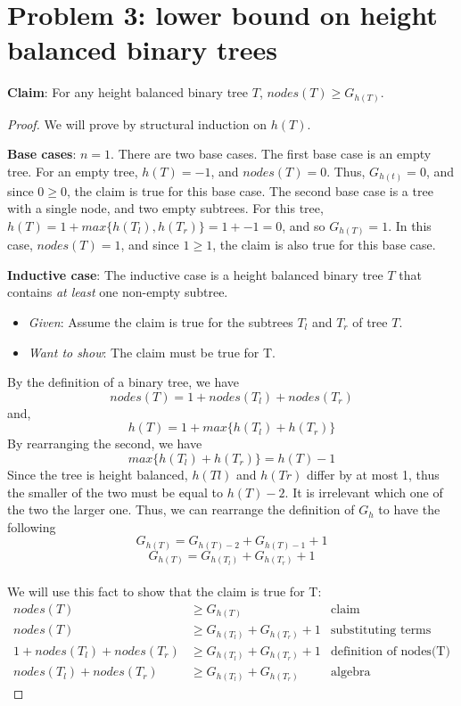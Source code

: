 \documentclass[titlepage]{article}
\begin{document}
\section{Problem 3: lower bound on height balanced binary trees}

\textbf{Claim}: For any height balanced binary tree $T$, $nodes(T) \geq G_{h(T)}$.

\begin{proof}
We will prove by structural induction on $h(T)$.

\textbf{Base cases}: $n=1$.  There are two base cases. The first base case is an empty tree. For an empty tree, $h(T) = -1$, and $nodes(T)=0$. Thus, $G_{h(t)}=0$, and since $0\geq0$, the claim is true for this base case. The second base case is a tree with a single node, and two empty subtrees. For this tree, $h(T) = 1 + max\{h(T_l), h(T_r)\} = 1 + -1 = 0$, and so $G_{h(T)} = 1$. In this case, $nodes(T)=1$, and since $1\geq1$, the claim is also true for this base case.


\textbf{Inductive case}: The inductive case is a height balanced binary tree $T$ that contains \textit{at least} one non-empty subtree.
\begin{itemize}
\item \emph{Given}: Assume the claim is true for the subtrees $T_l$ and $T_r$ of tree $T$.
\item \emph{Want to show}: The claim must be true for T.
\end{itemize}
By the definition of a binary tree, we have
$$nodes(T) = 1 + nodes(T_l) + nodes(T_r)$$
and,
$$h(T) = 1 + max\{h(T_l) + h(T_r)\}$$
By rearranging the second, we have
$$max\{h(T_l) + h(T_r)\} = h(T) - 1$$
Since the tree is height balanced, $h(Tl)$ and $h(Tr)$ differ by at most 1, thus the smaller of the two must be equal to $h(T) - 2$. It is irrelevant which one of the two the larger one. Thus, we can rearrange the definition of $G_h$ to have the following
$$G_{h(T)}= G_{h(T)-2} + G_{h(T)-1} + 1$$
$$G_{h(T)}= G_{h(T_l)} + G_{h(T_r)} + 1$$\\

We will use this fact to show that the claim is true for T:
\begin{align*}
nodes(T) &\geq G_{h(T)} & \text{claim} \\
nodes(T) &\geq G_{h(T_l)} + G_{h(T_r)} + 1 & \text{substituting terms} \\
1 + nodes(T_l) + nodes(T_r) &\geq G_{h(T_l)} + G_{h(T_r)} + 1 & \text{definition of nodes(T)}\\
nodes(T_l) + nodes(T_r) &\geq G_{h(T_l)} + G_{h(T_r)}& \text{algebra}
\end{align*}
\end{proof}
\end{document}
